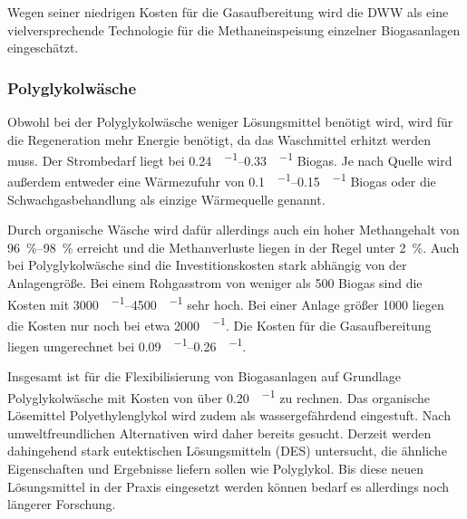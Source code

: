 Wegen seiner niedrigen Kosten für die Gasaufbereitung wird die \gls{DWW} als eine vielversprechende Technologie für die Methaneinspeisung einzelner Biogasanlagen eingeschätzt.\smallskip


\subsubsection{Polyglykolwäsche}
Obwohl bei der Polyglykolwäsche weniger Lösungsmittel benötigt wird, wird für die Regeneration mehr Energie benötigt, da das Waschmittel erhitzt werden muss. Der Strombedarf liegt bei \SIrange{0,24}{0,33}{\kwh\per\normvol} Biogas. Je nach Quelle wird außerdem entweder eine Wärmezufuhr von \SIrange{0,1}{0,15}{\kwh\per\normvol} Biogas oder die Schwachgasbehandlung als einzige Wärmequelle genannt. \parencite{Emp18}\smallskip

Durch organische Wäsche wird dafür allerdings auch ein hoher Methangehalt von \SIrange{96}{98}{\percent} erreicht und die Methanverluste liegen in der Regel unter \SI{2}{\percent}. Auch bei Polyglykolwäsche sind die Investitionskosten stark abhängig von der Anlagengröße. Bei einem Rohgasstrom von weniger als \SI{500}{\normvolh} Biogas sind die Kosten mit \SIrange{3000}{4500}{\sieuro\per\normvolh} sehr hoch. Bei einer Anlage größer \SI{1000}{\normvolh} liegen die Kosten nur noch bei etwa \SI{2000}{\sieuro\per\normvolh}. Die Kosten für die Gasaufbereitung liegen umgerechnet bei \SIrange{0,09}{0,26}{\sieuro\per\normvol}. \parencite{FNR14}\smallskip

Insgesamt ist für die Flexibilisierung von Biogasanlagen auf Grundlage Polyglykolwäsche mit Kosten von über \SI{0,20}{\sieuro\per\normvol} zu rechnen. Das organische Lösemittel Polyethylenglykol wird zudem als wassergefährdend eingestuft. Nach umweltfreundlichen Alternativen wird daher bereits gesucht. Derzeit werden dahingehend stark eutektischen Lösungsmitteln (DES) untersucht, die ähnliche Eigenschaften und Ergebnisse liefern sollen wie Polyglykol. Bis diese neuen Lösungsmittel in der Praxis eingesetzt werden können bedarf es allerdings noch längerer Forschung. \parencite{FNR14} \parencite{Struk20}



